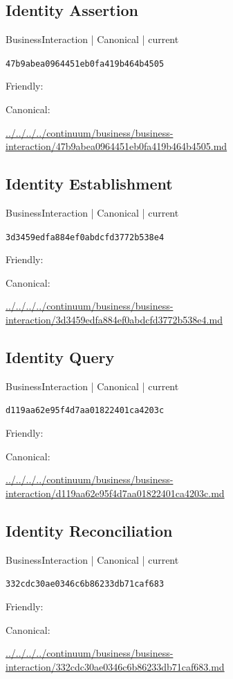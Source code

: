 \documentclass[10pt,a4paper]{article}
\begin{document}
\subsection*{Identity Assertion}
{\small BusinessInteraction | Canonical | current}\par
\texttt{47b9abea0964451eb0fa419b464b4505}\par
Friendly: \par
Canonical: \par
{\footnotesize\url{../../../../continuum/business/business-interaction/47b9abea0964451eb0fa419b464b4505.md}}\par
\subsection*{Identity Establishment}
{\small BusinessInteraction | Canonical | current}\par
\texttt{3d3459edfa884ef0abdcfd3772b538e4}\par
Friendly: \par
Canonical: \par
{\footnotesize\url{../../../../continuum/business/business-interaction/3d3459edfa884ef0abdcfd3772b538e4.md}}\par
\subsection*{Identity Query}
{\small BusinessInteraction | Canonical | current}\par
\texttt{d119aa62e95f4d7aa01822401ca4203c}\par
Friendly: \par
Canonical: \par
{\footnotesize\url{../../../../continuum/business/business-interaction/d119aa62e95f4d7aa01822401ca4203c.md}}\par
\subsection*{Identity Reconciliation}
{\small BusinessInteraction | Canonical | current}\par
\texttt{332cdc30ae0346c6b86233db71caf683}\par
Friendly: \par
Canonical: \par
{\footnotesize\url{../../../../continuum/business/business-interaction/332cdc30ae0346c6b86233db71caf683.md}}\par
\end{document}
